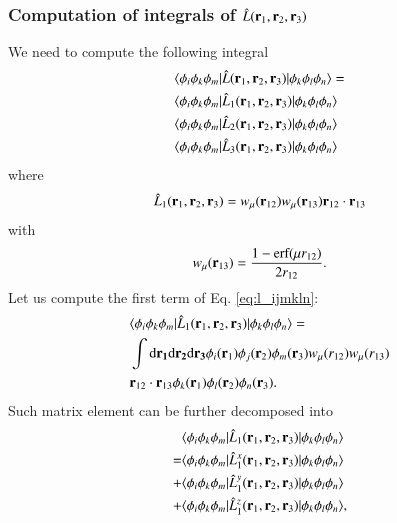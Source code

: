 \documentclass[aip,jcp,reprint,noshowkeys,superscriptaddress]{revtex4-1}
\newcommand{\matelem}[3]{\langle #1 | #2 | #3 \rangle}
\newcommand{\bri}[1]{{\bf r}_{#1}}
\newcommand{\dr}[1]{\text{d}{\bf r_{#1}}}
\begin{document}
\subsubsection{Computation of integrals of $\hat{L}(\bri{1},\bri{2},\bri{3})$}
We need to compute the following integral 
\begin{equation}
 \label{eq:l_ijmkln}
 \begin{aligned}
 & \matelem{\phi_i \phi_k \phi_m}{\hat{L}(\bri{1},\bri{2},\bri{3})}{\phi_k \phi_l \phi_n} = \\
 & \matelem{\phi_i \phi_k \phi_m}{\hat{L}_1(\bri{1},\bri{2},\bri{3})}{\phi_k \phi_l \phi_n} \\
 & \matelem{\phi_i \phi_k \phi_m}{\hat{L}_2(\bri{1},\bri{2},\bri{3})}{\phi_k \phi_l \phi_n} \\
 & \matelem{\phi_i \phi_k \phi_m}{\hat{L}_3(\bri{1},\bri{2},\bri{3})}{\phi_k \phi_l \phi_n} 
 \end{aligned}
\end{equation}
where 
\begin{equation}
 \hat{L}_1(\bri{1},\bri{2},\bri{3}) = w_\mu(\bri{12}) w_\mu(\bri{13}) \bri{12} \cdot \bri{13}
\end{equation}
with 
\begin{equation}
 w_\mu(\bri{13}) = \frac{1 - \text{erf}(\mu r_{12})}{2 r_{12}}.
\end{equation}
Let us compute the first term of Eq. \eqref{eq:l_ijmkln}:
\begin{equation}
 \begin{aligned}
 & \matelem{\phi_i \phi_k \phi_m}{\hat{L}_1(\bri{1},\bri{2},\bri{3})}{\phi_k \phi_l \phi_n} = \\
 & \int \dr{1} \dr{2} \dr{3} \phi_i(\bri{1}) \phi_j(\bri{2}) \phi_m(\bri{3}) w_{\mu}(r_{12}) w_{\mu}(r_{13}) \\ 
 &\bri{12} \cdot \bri{13}  \phi_k(\bri{1}) \phi_l(\bri{2}) \phi_n(\bri{3}).
 \end{aligned}
\end{equation}
Such matrix element can be further decomposed into
\begin{equation}
 \begin{aligned}
 & \matelem{\phi_i \phi_k \phi_m}{\hat{L}_1(\bri{1},\bri{2},\bri{3})}{\phi_k \phi_l \phi_n}  \\
 =& \matelem{\phi_i \phi_k \phi_m}{\hat{L}_1^x(\bri{1},\bri{2},\bri{3})}{\phi_k \phi_l \phi_n} \\  
+ & \matelem{\phi_i \phi_k \phi_m}{\hat{L}_1^y(\bri{1},\bri{2},\bri{3})}{\phi_k \phi_l \phi_n} \\  
+ & \matelem{\phi_i \phi_k \phi_m}{\hat{L}_1^z(\bri{1},\bri{2},\bri{3})}{\phi_k \phi_l \phi_n},  
 \end{aligned}
\end{equation}
\end{document}
